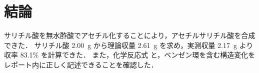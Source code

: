 \section{結論}
サリチル酸を無水酢酸でアセチル化することにより，アセチルサリチル酸を合成できた．
サリチル酸 \SI{2.00}{g} から理論収量 \SI{2.61}{g} を求め，実測収量 \SI{2.17}{g} より収率 83.1\% を計算できた．
また，化学反応式  と，ベンゼン環を含む構造変化をレポート内に正しく記述できることを確認した．